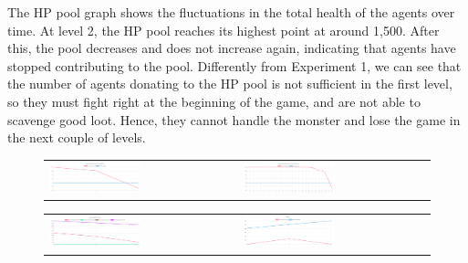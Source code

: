 The HP pool graph shows the fluctuations in the total health of the agents over time. At level 2, the HP pool reaches its highest point at around 1,500. After this, the pool decreases and does not increase again, indicating that agents have stopped contributing to the pool. Differently from Experiment 1, we can see that the number of agents donating to the HP pool is not sufficient in the first level, so they must fight right at the beginning of the game, and are not able to scavenge good loot. Hence, they cannot handle the monster and lose the game in the next couple of levels.  


\begin{figure}[htbp]
\begin{tabular}{ll}
    \centering
    \includegraphics[width=0.5\textwidth]{007_team_4_agent_design/figures/EX2_1.jpg}
    &
    \includegraphics[width=0.5\textwidth]{007_team_4_agent_design/figures/EX2_2.jpg}
\end{tabular}

\end{figure}

\begin{figure}[htbp]
\begin{tabular}{ll}
    \centering
    \includegraphics[width=0.5\textwidth]{007_team_4_agent_design/figures/EX2_5.jpg}
    &
    \includegraphics[width=0.5\textwidth]{007_team_4_agent_design/figures/EX2_6.jpg}
\end{tabular}

\end{figure}


